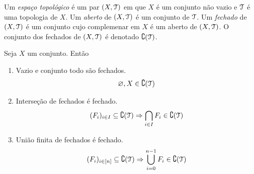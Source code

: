 \begin{defi}
	Um \emph{espaço topológico} é um par $(X,\mathcal{T})$ em que $X$ é um conjunto não vazio e $\mathcal{T}$ é uma topologia de $X$. Um \emph{aberto} de $(X,\mathcal{T})$ é um conjunto de $\mathcal{T}$. Um \emph{fechado} de $(X,\mathcal{T})$ é um conjunto cujo complemenar em $X$ é um aberto de $(X,\mathcal{T})$. O conjunto dos fechados de $(X,\mathcal{T})$ é denotado $\complement (\mathcal{T})$.
\end{defi}

\begin{prop}
	Seja $X$ um conjunto. Então
	\begin{enumerate}
	\item Vazio e conjunto todo são fechados.
	\begin{equation*}
	\varnothing, X \in \complement (\mathcal{T})
	\end{equation*}

	\item Interseção de fechados é fechado.
	\begin{equation*}
	(F_i)_{i \in I} \subseteq \complement (\mathcal{T}) \Rightarrow \bigcap_{i \in I} F_i  \in \complement (\mathcal{T})
	\end{equation*}
	
	\item União finita de fechados é fechado.
	\begin{equation*}
	(F_i)_{i \in [n]} \subseteq \complement (\mathcal{T}) \Rightarrow \bigcup_{i=0}^{n-1} F_i \in \complement (\mathcal{T})
	\end{equation*}
	

	\end{enumerate}
\end{prop}
